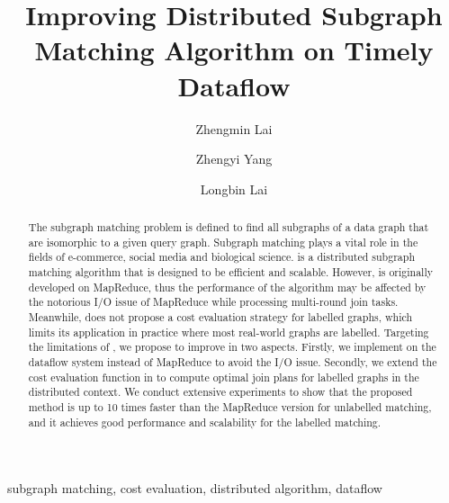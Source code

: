 \documentclass[conference]{IEEEtran}
\begin{document}
\title{Improving Distributed Subgraph Matching Algorithm on Timely Dataflow}

\author[1]{Zhengmin Lai}
\author[2]{Zhengyi Yang}
\author[2]{Longbin Lai}

\maketitle

\begin{abstract}
The subgraph matching problem is defined to find all subgraphs of a data graph that are isomorphic to a given query graph. Subgraph matching plays a vital role in the fields of e-commerce, social media and biological science. \cliquejoin is a distributed subgraph matching algorithm that is designed to be efficient and scalable. However, \cliquejoin is originally developed on MapReduce, thus the performance of the algorithm may be affected by the notorious I/O issue of MapReduce while processing multi-round join tasks. Meanwhile, \cliquejoin does not propose a cost evaluation strategy for labelled graphs, which limits its application in practice where most real-world graphs are labelled. Targeting the limitations of \cliquejoin, we propose \gencliqjoin to improve \cliquejoin in two aspects. Firstly, we implement \gencliqjoin on the \timely dataflow system instead of MapReduce to avoid the I/O issue. Secondly, we extend the cost evaluation function in \cliquejoin to compute optimal join plans for labelled graphs in the distributed context. We conduct extensive experiments to show that the proposed method is up to 10 times faster than the MapReduce version for unlabelled matching, and it achieves good performance and scalability for the labelled matching.
\end{abstract}

\begin{IEEEkeywords}
 subgraph matching, cost evaluation, distributed algorithm, dataflow
\end{IEEEkeywords}















\end{document}
